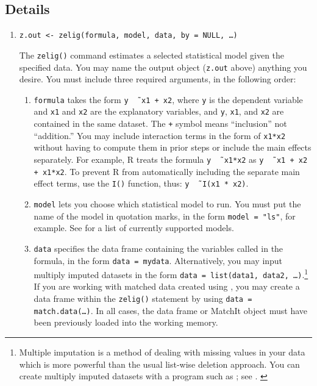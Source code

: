 \begin{itemize}
\end{itemize}

\subsection{Details}

\begin{enumerate}
\item {\tt z.out <- zelig(formula, model, data, by = NULL, \dots)}
 
  The {\tt zelig()} command estimates a selected statistical model
  given the specified data.  You may name the output object
  (\texttt{z.out} above) anything you desire.  You must include three
  required arguments, in the following order:

  \begin{enumerate}

  \item \texttt{formula} takes the form {\tt y \~\, x1 + x2}, where
    {\tt y} is the dependent variable and {\tt x1} and {\tt x2} are
    the explanatory variables, and {\tt y}, {\tt x1}, and {\tt x2} are
    contained in the same dataset.  The {\tt +} symbol means
    ``inclusion'' not ``addition.''  You may include interaction terms
    in the form of {\tt x1*x2} without having to compute them in prior
    steps or include the main effects separately.  For example, R
    treats the formula {\tt y \~\, x1*x2} as {\tt y \~\, x1 + x2 +
      x1*x2}.  To prevent R from automatically including the separate
    main effect terms, use the {\tt I()} function, thus: {\tt y \~\,
      I(x1 * x2)}.

  \item \texttt{model} lets you choose which statistical model to run.
    You must put the name of the model in quotation marks, in the form
    {\tt model = "ls"}, for example.  See  for a list
    of currently supported models.

  \item \texttt{data} specifies the data frame containing the
    variables called in the formula, in the form {\tt data = mydata}.
    Alternatively, you may input multiply imputed datasets in the form
    {\tt data = list(data1, data2, \dots)}.\footnote{Multiple
      imputation is a method of dealing with missing values in your
      data which is more powerful than the usual list-wise deletion
      approach.  You can create multiply imputed datasets with a
      program such as
      ;
      see .
    \label{mi}}  If you are working with matched data created using
  , you may create a
  data frame within the {\tt zelig()} statement by using {\tt data =
    match.data(\dots)}.  In all cases, the data frame or MatchIt
  object must have been previously loaded into the working memory.
  

\end{enumerate}
\end{enumerate}
